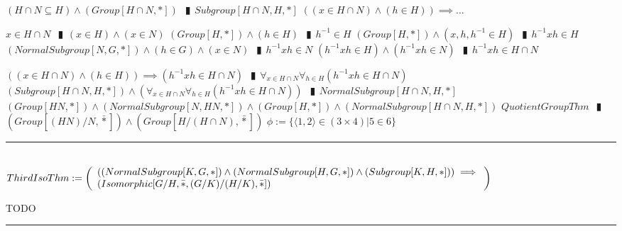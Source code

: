 \documentclass{book}
\newcommand{\abr}{:=}
\newcommand{\pipe}{$\phantom{(}\vrectangleblack\phantom{)}$}
\newcommand{\pr}[1]{\left(#1\right)}
\newcommand{\bbin}[1]{\mathbin{{\bar{#1}}}}
\begin{document}
\begin{enumerate}
  \lit $(H \cap N \subseteq H) \land (Group[H \cap N, *])$ \pipe $Subgroup[H \cap N, H, *]$
  \lit $\pr{(x \in H \cap N) \land (h \in H)} \implies \ldots$
  \begin{enumerate}
    \lit $x \in H \cap N$ \pipe $(x \in H) \land (x \in N)$
    \lit $(Group[H, *]) \land (h \in H)$ \pipe $h^{-1} \in H$
    \lit $(Group[H, *]) \land (x, h, h^{-1} \in H)$ \pipe $h^{-1} x h \in H$
    \lit $(NormalSubgroup[N, G, *]) \land (h \in G) \land (x \in N)$ \pipe $h^{-1} x h \in N$
    \lit $(h^{-1} x h \in H) \land (h^{-1} x h \in N)$ \pipe $h^{-1} x h \in H \cap N$
  \end{enumerate}
  \lit $\pr{(x \in H \cap N) \land (h \in H)} \implies (h^{-1} x h \in H \cap N)$ \pipe $\forall_{x \in H \cap N} \forall_{h \in H}(h^{-1} x h \in H \cap N)$
  \lit $(Subgroup[H \cap N, H, *]) \land \pr{\forall_{x \in H \cap N} \forall_{h \in H}(h^{-1} x h \in H \cap N)}$ \pipe $NormalSubgroup[H \cap N, H, *]$
  \lit $(Group[H N, *]) \land (NormalSubgroup[N, H N, *]) \land (Group[H, *]) \land (NormalSubgroup[H \cap N, H, *])$
  \lit $QuotientGroupThm$ \pipe $\pr{Group[(H N) / N, \bbin{*}]} \land \pr{Group[H / (H \cap N), \bbin{*}]}$
  \lit $\phi \abr \{\langle 1, 2 \rangle \in (3 \times 4) | 5 \in 6\}$
\end{enumerate} \vspace{.75mm} \hrule \vspace{.75mm} \ \\ 

$ThirdIsoThm \abr \left(\begin{array}{ll}
  \pr{(NormalSubgroup[K, G, *]) \hfill \land \hfill (NormalSubgroup[H, G, *]) \hfill \land \hfill (Subgroup[K, H, *])} \hfill \implies \hfill \\
  \pr{Isomorphic[G / H, \bbin{*}, (G / K) / (H / K), \bbin{*}]}
\end{array}\right)$
\begin{enumerate}
  \lit TODO
\end{enumerate} \vspace{.75mm} \hrule \vspace{.75mm} \ \\ 

%
%
\end{document}
